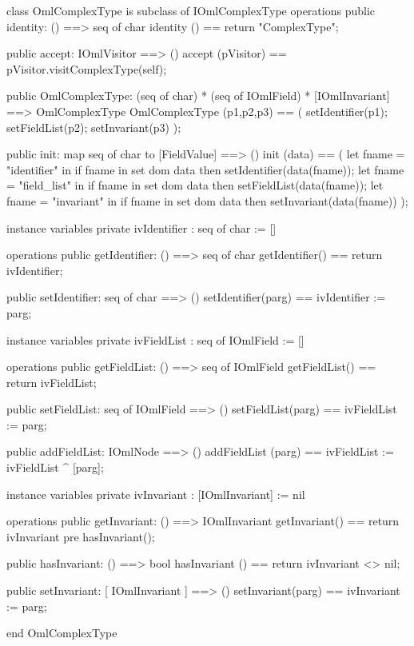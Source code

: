 \begin{vdm_al}
class OmlComplexType is subclass of IOmlComplexType
operations
  public identity: () ==> seq of char
  identity () == return "ComplexType";

  public accept: IOmlVisitor ==> ()
  accept (pVisitor) == pVisitor.visitComplexType(self);

  public OmlComplexType:
      (seq of char) *
      (seq of IOmlField) *
      [IOmlInvariant] ==> OmlComplexType
  OmlComplexType (p1,p2,p3) == 
   ( setIdentifier(p1);
     setFieldList(p2);
     setInvariant(p3) );

  public init: map seq of char to [FieldValue] ==> ()
  init (data) ==
    ( let fname = "identifier" in
        if fname in set dom data
        then setIdentifier(data(fname));
      let fname = "field_list" in
        if fname in set dom data
        then setFieldList(data(fname));
      let fname = "invariant" in
        if fname in set dom data
        then setInvariant(data(fname)) );

instance variables
  private ivIdentifier : seq of char := []

operations
  public getIdentifier: () ==> seq of char
  getIdentifier() == return ivIdentifier;

  public setIdentifier: seq of char ==> ()
  setIdentifier(parg) == ivIdentifier := parg;

instance variables
  private ivFieldList : seq of IOmlField := []

operations
  public getFieldList: () ==> seq of IOmlField
  getFieldList() == return ivFieldList;

  public setFieldList: seq of IOmlField ==> ()
  setFieldList(parg) == ivFieldList := parg;

  public addFieldList: IOmlNode ==> ()
  addFieldList (parg) == ivFieldList := ivFieldList ^ [parg];

instance variables
  private ivInvariant : [IOmlInvariant] := nil

operations
  public getInvariant: () ==> IOmlInvariant
  getInvariant() == return ivInvariant
    pre hasInvariant();

  public hasInvariant: () ==> bool
  hasInvariant () == return ivInvariant <> nil;

  public setInvariant: [ IOmlInvariant ] ==> ()
  setInvariant(parg) == ivInvariant := parg;

end OmlComplexType
\end{vdm_al}

